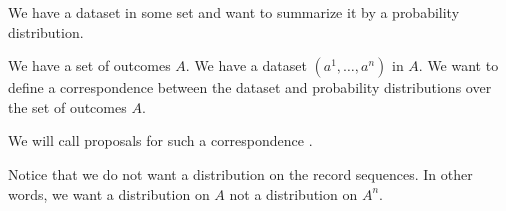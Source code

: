 

We have a dataset in some set and want to
summarize it by a probability distribution.


We have a set of outcomes $A$.
We have a dataset $(a^1, \dots, a^n)$
in $A$.
We want to define a correspondence between
the dataset and probability distributions
over the set of outcomes $A$.

We will call proposals for such a correspondence
.

Notice that we do not want a distribution on
the record sequences. In other words, we want
a distribution on $A$ not a distribution on
$A^n$.
